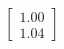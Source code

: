 \documentclass[preview]{standalone}
\begin{document}
\begin{align*}
\begin{bmatrix} 1.00 \\ 1.04 \end{bmatrix}
\end{align*}
\end{document}
